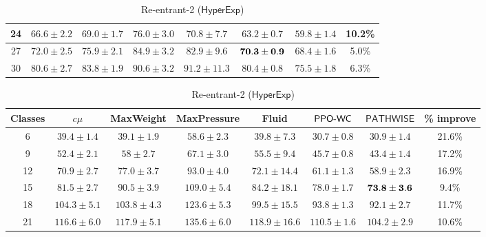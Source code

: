 \begin{table}[h!]
\begin{tabular}{cccccccc}
\midrule 
{\footnotesize{}24 } & {\footnotesize{}$66.6\pm2.2$} & {\footnotesize{}$69.0\pm1.7$} & {\footnotesize{}$76.0\pm3.0$} & {\footnotesize{}$70.8\pm7.7$} & {\footnotesize{}$63.2\pm0.7$} & {\footnotesize{}$\mathbf{59.8\pm1.4}$} & {\footnotesize{}10.2\%}\tabularnewline
\midrule 
{\footnotesize{}27 } & {\footnotesize{}$72.0\pm2.5$} & {\footnotesize{}$75.9\pm2.1$} & {\footnotesize{}$84.9\pm3.2$} & {\footnotesize{}$82.9\pm9.6$} & {\footnotesize{}${\bf 70.3\pm0.9}$} & {\footnotesize{}$\mathbf{68.4\pm1.6}$} & {\footnotesize{}5.0\%}\tabularnewline
\midrule 
{\footnotesize{}30 } & {\footnotesize{}$80.6\pm2.7$} & {\footnotesize{}$83.8\pm1.9$} & {\footnotesize{}$90.6\pm3.2$} & {\footnotesize{}$91.2\pm11.3$} & {\footnotesize{}$80.4\pm0.8$} & {\footnotesize{}$\mathbf{75.5\pm1.8}$} & {\footnotesize{}6.3\%}\tabularnewline
\bottomrule
\end{tabular}

 \caption{Re-entrant-2 ($\mathsf{HyperExp}$)}

\begin{tabular}{cccccccc}
\toprule 
{\footnotesize{}Classes} & {\footnotesize{}$c\mu$ } & {\footnotesize{}MaxWeight } & {\footnotesize{}MaxPressure} & {\footnotesize{}Fluid } & {\footnotesize{}$\mathsf{PPO}\text{-}\mathsf{WC}$} & {\footnotesize{}$\mathsf{PATHWISE}$} & {\footnotesize{}\% improve}\tabularnewline
\midrule 
{\footnotesize{}6} & {\footnotesize{}$39.4\pm1.4$} & {\footnotesize{}$39.1\pm1.9$} & {\footnotesize{}$58.6\pm2.3$} & {\footnotesize{}$39.8\pm7.3$} & {\footnotesize{}$\mathbf{30.7\pm0.8}$} & {\footnotesize{}$\mathbf{30.9\pm1.4}$} & {\footnotesize{}21.6\%}\tabularnewline
\midrule 
{\footnotesize{}9} & {\footnotesize{}$52.4\pm2.1$} & {\footnotesize{}$58\pm2.7$} & {\footnotesize{}$67.1\pm3.0$} & {\footnotesize{}$55.5\pm9.4$} & {\footnotesize{}$\mathbf{45.7\pm0.8}$} & {\footnotesize{}$\mathbf{43.4\pm1.4}$} & {\footnotesize{}17.2\%}\tabularnewline
\midrule 
{\footnotesize{}12 } & {\footnotesize{}$70.9\pm2.7$} & {\footnotesize{}$77.0\pm3.7$} & {\footnotesize{}$93.0\pm4.0$} & {\footnotesize{}$72.1\pm14.4$} & {\footnotesize{}$\mathbf{61.1\pm1.3}$} & {\footnotesize{}$\mathbf{58.9\pm2.3}$} & {\footnotesize{}16.9\%}\tabularnewline
\midrule 
{\footnotesize{}15 } & {\footnotesize{}$81.5\pm2.7$} & {\footnotesize{}$90.5\pm3.9$} & {\footnotesize{}$109.0\pm5.4$} & {\footnotesize{}$84.2\pm18.1$} & {\footnotesize{}$78.0\pm1.7$} & {\footnotesize{}${\bf 73.8\pm3.6}$} & {\footnotesize{}9.4\%}\tabularnewline
\midrule 
{\footnotesize{}18 } & {\footnotesize{}$104.3\pm5.1$} & {\footnotesize{}$103.8\pm4.3$} & {\footnotesize{}$123.6\pm5.3$} & {\footnotesize{}$99.5\pm15.5$} & {\footnotesize{}$\mathbf{93.8\pm1.3}$} & {\footnotesize{}$\mathbf{92.1\pm2.7}$} & {\footnotesize{}11.7\%}\tabularnewline
\midrule 
{\footnotesize{}21 } & {\footnotesize{}$116.6\pm6.0$} & {\footnotesize{}$117.9\pm5.1$} & {\footnotesize{}$135.6\pm6.0$} & {\footnotesize{}$118.9\pm16.6$} & {\footnotesize{}$110.5\pm1.6$} & {\footnotesize{}$\mathbf{104.2\pm2.9}$} & {\footnotesize{}10.6\%}\tabularnewline
\bottomrule
\end{tabular}
\end{table}